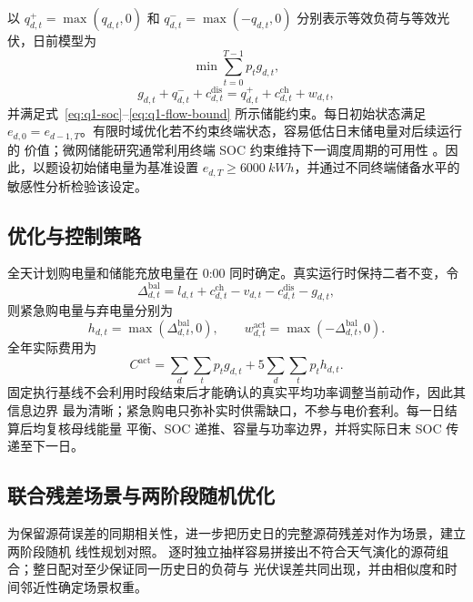 \documentclass[withoutpreface,bwprint]{cumcmthesis}
\begin{document}
以 $q_{d,t}^{+}=\max(q_{d,t},0)$ 和
$q_{d,t}^{-}=\max(-q_{d,t},0)$ 分别表示等效负荷与等效光伏，日前模型为
\begin{equation}
  \min\sum_{t=0}^{T-1}p_tg_{d,t},
  \label{eq:q2-plan-objective}
\end{equation}
\begin{equation}
  g_{d,t}+q_{d,t}^{-}+c_{d,t}^{\mathrm{dis}}
  =q_{d,t}^{+}+c_{d,t}^{\mathrm{ch}}+w_{d,t},
  \label{eq:q2-plan-balance}
\end{equation}
并满足式~\eqref{eq:q1-soc}--\eqref{eq:q1-flow-bound} 所示储能约束。每日初始状态满足
$e_{d,0}=e_{d-1,T}$。有限时域优化若不约束终端状态，容易低估日末储电量对后续运行的
价值；微网储能研究通常利用终端 SOC 约束维持下一调度周期的可用性
\cite{jayawardana2019}。因此，以题设初始储电量为基准设置
$e_{d,T}\ge\SI{6000}{kWh}$，并通过不同终端储备水平的敏感性分析检验该设定。

\subsection{优化与控制策略}

全天计划购电量和储能充放电量在 0:00 同时确定。真实运行时保持二者不变，令
\begin{equation}
  \Delta_{d,t}^{\mathrm{bal}}=l_{d,t}+c_{d,t}^{\mathrm{ch}}-v_{d,t}
  -c_{d,t}^{\mathrm{dis}}-g_{d,t},
\end{equation}
则紧急购电量与弃电量分别为
\begin{equation}
  h_{d,t}=\max(\Delta_{d,t}^{\mathrm{bal}},0),\qquad
  w^{\mathrm{act}}_{d,t}=\max(-\Delta_{d,t}^{\mathrm{bal}},0).
  \label{eq:q2-settlement}
\end{equation}
全年实际费用为
\begin{equation}
  C^{\mathrm{act}}=
  \sum_d\sum_t p_tg_{d,t}+5\sum_d\sum_t p_th_{d,t}.
  \label{eq:q2-total-cost}
\end{equation}
固定执行基线不会利用时段结束后才能确认的真实平均功率调整当前动作，因此其信息边界
最为清晰；紧急购电只弥补实时供需缺口，不参与电价套利。每一日结算后均复核母线能量
平衡、SOC 递推、容量与功率边界，并将实际日末 SOC 传递至下一日。

\subsection{联合残差场景与两阶段随机优化}

为保留源荷误差的同期相关性，进一步把历史日的完整源荷残差对作为场景，建立两阶段随机
线性规划对照\cite{parisio2016,liu2017}。
逐时独立抽样容易拼接出不符合天气演化的源荷组合；整日配对至少保证同一历史日的负荷与
光伏误差共同出现，并由相似度和时间邻近性确定场景权重。
\end{document}
